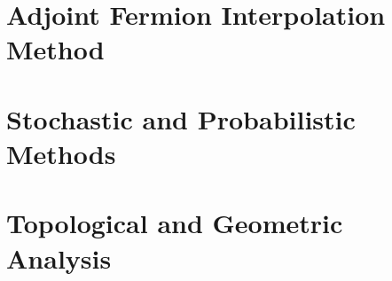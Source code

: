 \documentclass[11pt,a4paper]{report}
\begin{document}
\chapter{Adjoint Fermion Interpolation Method}
\label{ch:adjoint}



\chapter{Stochastic and Probabilistic Methods}
\label{ch:stochastic}





\chapter{Topological and Geometric Analysis}
\label{ch:topological}






\end{document}
